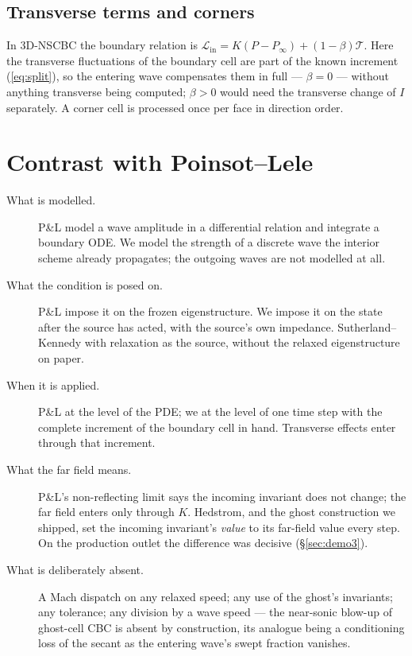 \documentclass[11pt,a4paper]{article}
\newcommand{\Lin}{\mathcal{L}_{\mathrm{in}}}
\newcommand{\Pinf}{P_\infty}
\begin{document}
\subsection{Transverse terms and corners}

In 3D-NSCBC the boundary relation is
$\Lin = K(P - \Pinf) + (1-\beta)\mathcal{T}$.  Here the transverse
fluctuations of the boundary cell are part of the known increment
(\ref{eq:split}), so the entering wave compensates them in full ---
$\beta = 0$ --- without anything transverse being computed; $\beta > 0$
would need the transverse change of $I$ separately.  A corner cell is
processed once per face in direction order.

\section{Contrast with Poinsot--Lele}

\begin{description}
\item[What is modelled.]  P\&L model a wave amplitude in a differential
relation and integrate a boundary ODE.  We model the strength of a
discrete wave the interior scheme already propagates; the outgoing waves
are not modelled at all.
\item[What the condition is posed on.]  P\&L impose it on the frozen
eigenstructure.  We impose it on the state after the source has acted,
with the source's own impedance.  Sutherland--Kennedy with relaxation as
the source, without the relaxed eigenstructure on paper.
\item[When it is applied.]  P\&L at the level of the PDE; we at the
level of one time step with the complete increment of the boundary cell
in hand.  Transverse effects enter through that increment.
\item[What the far field means.]  P\&L's non-reflecting limit says the
incoming invariant does not change; the far field enters only through
$K$.  Hedstrom, and the ghost construction we shipped, set the incoming
invariant's \emph{value} to its far-field value every step.  On the
production outlet the difference was decisive (\S\ref{sec:demo3}).
\item[What is deliberately absent.]  A Mach dispatch on any relaxed
speed; any use of the ghost's invariants; any tolerance; any division by
a wave speed --- the near-sonic blow-up of ghost-cell CBC is absent by
construction, its analogue being a conditioning loss of the secant as
the entering wave's swept fraction vanishes.
\end{description}
\end{document}
